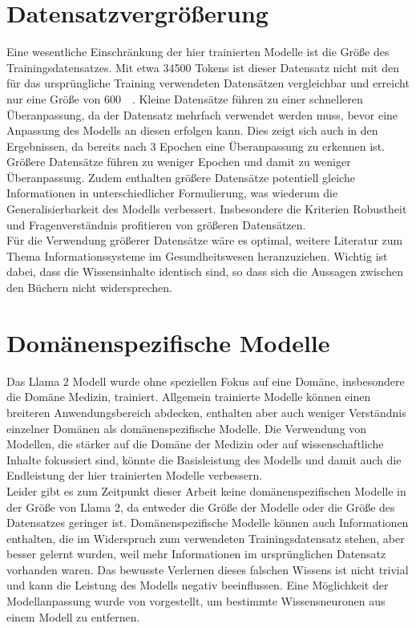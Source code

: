\section{Datensatzvergrößerung}
Eine wesentliche Einschränkung der hier trainierten Modelle ist die Größe des Trainingsdatensatzes.
Mit etwa \num{34500} Tokens ist dieser Datensatz nicht mit den für das ursprüngliche Training verwendeten Datensätzen vergleichbar und erreicht nur eine Größe von \SI{600}{\kilo\byte}. Kleine Datensätze führen zu einer schnelleren Überanpassung, da der Datensatz mehrfach verwendet werden muss, bevor eine Anpassung des Modells an diesen erfolgen kann.
Dies zeigt sich auch in den Ergebnissen, da bereits nach 3 Epochen eine Überanpassung zu erkennen ist.
Größere Datensätze führen zu weniger Epochen und damit zu weniger Überanpassung.
Zudem enthalten größere Datensätze potentiell gleiche Informationen in unterschiedlicher Formulierung, was wiederum die Generalisierbarkeit des Modells verbessert.
Insbesondere die Kriterien Robustheit und Fragenverständnis profitieren von größeren Datensätzen.\\

Für die Verwendung größerer Datensätze wäre es optimal, weitere Literatur zum Thema Informationssysteme im Gesundheitswesen heranzuziehen.
Wichtig ist dabei, dass die Wissensinhalte identisch sind, so dass sich die Aussagen zwischen den Büchern nicht widersprechen.

\section{Domänenspezifische Modelle}
Das Llama 2 Modell wurde ohne speziellen Fokus auf eine Domäne, insbesondere die Domäne Medizin, trainiert.
Allgemein trainierte Modelle können einen breiteren Anwendungsbereich abdecken, enthalten aber auch weniger Verständnis einzelner Domänen als domänenspezifische Modelle.
Die Verwendung von Modellen, die stärker auf die Domäne der Medizin oder auf wissenschaftliche Inhalte fokussiert sind, könnte die Basisleistung des Modells und damit auch die Endleistung der hier trainierten Modelle verbessern.\\

Leider gibt es zum Zeitpunkt dieser Arbeit keine domänenspezifischen Modelle in der Größe von Llama 2, da entweder die Größe der Modelle oder die Größe des Datensatzes geringer ist.
Domänenspezifische Modelle können auch Informationen enthalten, die im Widerspruch zum verwendeten Trainingsdatensatz stehen, aber besser gelernt wurden, weil mehr Informationen im ursprünglichen Datensatz vorhanden waren.
Das bewusste Verlernen dieses falschen Wissens ist nicht trivial und kann die Leistung des Modells negativ beeinflussen.
Eine Möglichkeit der Modellanpassung wurde von \citet{knowledge_neurons} vorgestellt, um bestimmte Wissensneuronen aus einem Modell zu entfernen.

